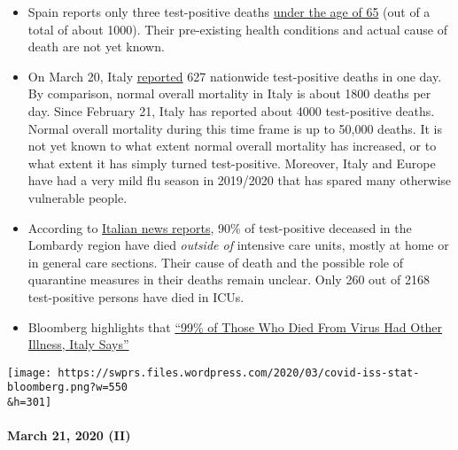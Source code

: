 \begin{itemize}
\tightlist
\item
  Spain reports only three test-positive deaths
  \href{https://www.20minutos.es/noticia/4193883/0/media-edad-coronavirus-espana/}{under
  the age of 65} (out of a total of about 1000). Their pre-existing
  health conditions and actual cause of death are not yet known.
\item
  On March 20, Italy
  \href{https://www.msn.com/en-au/news/coronavirus/italy-coronavirus-deaths-surge-by-627-in-a-day-lifting-total-death-toll-to-4032/ar-BB11tDnS}{reported}
  627 nationwide test-positive deaths in one day. By comparison, normal
  overall mortality in Italy is about 1800 deaths per day. Since
  February 21, Italy has reported about 4000 test-positive deaths.
  Normal overall mortality during this time frame is up to 50,000
  deaths. It is not yet known to what extent normal overall mortality
  has increased, or to what extent it has simply turned test-positive.
  Moreover, Italy and Europe have had a very mild flu season in
  2019/2020 that has spared many otherwise vulnerable people.
\item
  According to
  \href{https://www.tgcom24.mediaset.it/cronaca/coronavirus-in-lombardia-9-morti-su-10-mai-giunti-in-terapia-intensiva_16362350-202002a.shtml}{Italian
  news reports}, 90\% of test-positive deceased in the Lombardy region
  have died \emph{outside of} intensive care units, mostly at home or in
  general care sections. Their cause of death and the possible role of
  quarantine measures in their deaths remain unclear. Only 260 out of
  2168 test-positive persons have died in ICUs.
\item
  Bloomberg highlights that
  \href{https://www.bloomberg.com/news/articles/2020-03-18/99-of-those-who-died-from-virus-had-other-illness-italy-says}{``99\%
  of Those Who Died From Virus Had Other Illness, Italy Says''}
\end{itemize}

\texttt{[image: https://swprs.files.wordpress.com/2020/03/covid-iss-stat-bloomberg.png?w=550\\\&h=301]}

\hypertarget{march-21-2020-ii}{%
\paragraph{March 21, 2020 (II)}\label{march-21-2020-ii}}

